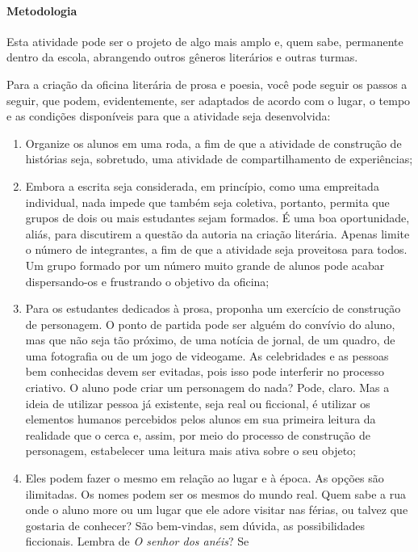 \documentclass[12pt]{extarticle}
\begin{document}
\paragraph{Metodologia} Esta atividade pode ser o projeto de algo mais
amplo e, quem sabe, permanente dentro da escola, abrangendo outros
gêneros literários e outras turmas.

Para a criação da oficina literária de prosa e poesia, você pode seguir
os passos a seguir, que podem, evidentemente, ser adaptados de acordo
com o lugar, o tempo e as condições disponíveis para que a atividade
seja desenvolvida:

\begin{enumerate}
\item
  Organize os alunos em uma roda, a fim de que a atividade de construção
  de histórias seja, sobretudo, uma atividade de compartilhamento de
  experiências;
\item
  Embora a escrita seja considerada, em princípio, como uma empreitada
  individual, nada impede que também seja coletiva, portanto, permita
  que grupos de dois ou mais estudantes sejam formados. É uma boa
  oportunidade, aliás, para discutirem a questão da autoria na criação
  literária. Apenas limite o número de integrantes, a fim de que a
  atividade seja proveitosa para todos. Um grupo formado por um número
  muito grande de alunos pode acabar dispersando-os e frustrando o
  objetivo da oficina;
\item
  Para os estudantes dedicados à prosa, proponha um exercício de
  construção de personagem. O ponto de partida pode ser alguém do
  convívio do aluno, mas que não seja tão próximo, de uma notícia de
  jornal, de um quadro, de uma fotografia ou de um jogo de videogame. As
  celebridades e as pessoas bem conhecidas devem ser evitadas, pois isso
  pode interferir no processo criativo. O aluno pode criar um personagem
  do nada? Pode, claro. Mas a ideia de utilizar pessoa já existente,
  seja real ou ficcional, é utilizar os elementos humanos percebidos
  pelos alunos em sua primeira leitura da realidade que o cerca e,
  assim, por meio do processo de construção de personagem, estabelecer
  uma leitura mais ativa sobre o seu objeto;
\item
  Eles podem fazer o mesmo em relação ao lugar e à época. As opções são
  ilimitadas. Os nomes podem ser os mesmos do mundo real. Quem sabe a
  rua onde o aluno more ou um lugar que ele adore visitar nas férias, ou
  talvez que gostaria de conhecer? São bem-vindas, sem dúvida, as
  possibilidades ficcionais. Lembra de \emph{O senhor dos anéis}? Se

\end{enumerate}
\end{document}

